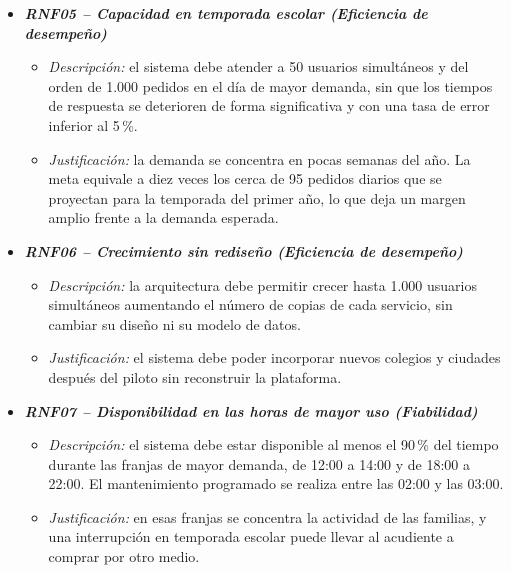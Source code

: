 \begin{itemize}
\item \textbf{\textit{RNF05 -- Capacidad en temporada escolar (Eficiencia de
      desempeño)}}
  \begin{itemize}
    \item \textit{Descripción:} el sistema debe atender a 50 usuarios simultáneos y del
          orden de 1.000 pedidos en el día de mayor demanda, sin que los tiempos de
          respuesta se deterioren de forma significativa y con una tasa de error inferior
          al 5\,\%.
    \item \textit{Justificación:} la demanda se concentra en pocas semanas del año. La
          meta equivale a diez veces los cerca de 95 pedidos diarios que se proyectan para
          la temporada del primer año, lo que deja un margen amplio frente a la demanda
          esperada.
  \end{itemize}

\item \textbf{\textit{RNF06 -- Crecimiento sin rediseño (Eficiencia de desempeño)}}
  \begin{itemize}
    \item \textit{Descripción:} la arquitectura debe permitir crecer hasta 1.000 usuarios
          simultáneos aumentando el número de copias de cada servicio, sin cambiar su
          diseño ni su modelo de datos.
    \item \textit{Justificación:} el sistema debe poder incorporar nuevos colegios y
          ciudades después del piloto sin reconstruir la plataforma.
  \end{itemize}

\item \textbf{\textit{RNF07 -- Disponibilidad en las horas de mayor uso (Fiabilidad)}}
  \begin{itemize}
    \item \textit{Descripción:} el sistema debe estar disponible al menos el 90\,\% del
          tiempo durante las franjas de mayor demanda, de 12:00 a 14:00 y de 18:00 a 22:00.
          El mantenimiento programado se realiza entre las 02:00 y las 03:00.
    \item \textit{Justificación:} en esas franjas se concentra la actividad de las familias,
          y una interrupción en temporada escolar puede llevar al acudiente a comprar por
          otro medio.
  \end{itemize}


\end{itemize}
